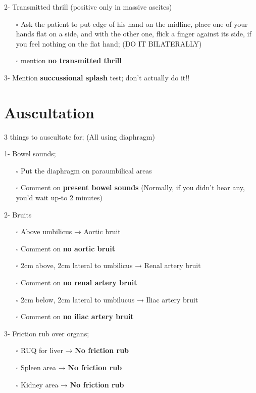 \documentclass[
  13.5pt,
  a4paper,
  DIV=11,
  numbers=noendperiod]{scrreprt}
\providecommand{\tightlist}{%
  \setlength{\itemsep}{0pt}\setlength{\parskip}{0pt}}
\begin{document}
2- Transmitted thrill (positive only in massive ascites)

\begin{itemize}
\tightlist
\item[$\square$]
  Ask the patient to put edge of his hand on the midline, place one of
  your hands flat on a side, and with the other one, flick a finger
  against its side, if you feel nothing on the flat hand; (DO IT
  BILATERALLY)
\item[$\square$]
  mention \textbf{no transmitted thrill}
\end{itemize}

3- Mention \textbf{succussional splash} test; don't actually do it!!

\section{Auscultation}\label{auscultation-1}

3 things to auscultate for; (All using diaphragm)

1- Bowel sounds;

\begin{itemize}
\tightlist
\item[$\square$]
  Put the diaphragm on paraumbilical areas
\item[$\square$]
  Comment on \textbf{present bowel sounds} (Normally, if you didn't hear
  any, you'd wait up-to 2 minutes)
\end{itemize}

2- Bruits

\begin{itemize}
\tightlist
\item[$\square$]
  Above umbilicus → Aortic bruit
\item[$\square$]
  Comment on \textbf{no aortic bruit}
\item[$\square$]
  2cm above, 2cm lateral to umbilicus → Renal artery bruit
\item[$\square$]
  Comment on \textbf{no renal artery bruit}
\item[$\square$]
  2cm below, 2cm lateral to umbilucus → Iliac artery bruit
\item[$\square$]
  Comment on \textbf{no iliac artery bruit}
\end{itemize}

3- Friction rub over organs;

\begin{itemize}
\tightlist
\item[$\square$]
  RUQ for liver → \textbf{No friction rub}
\item[$\square$]
  Spleen area → \textbf{No friction rub}
\item[$\square$]
  Kidney area → \textbf{No friction rub}
\end{itemize}
\end{document}
